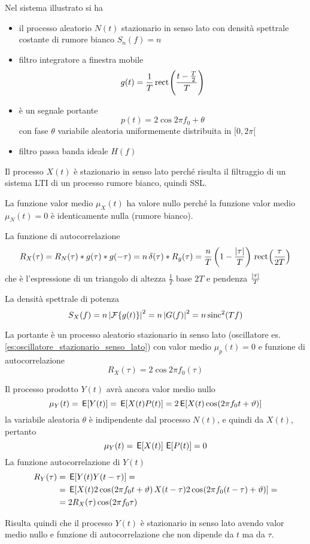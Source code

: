 Nel sistema illustrato si ha
\begin{itemize}
\item il processo aleatorio $N(t)$ stazionario in senso lato con densità spettrale costante di rumore bianco $S_n(f)=n$
\item filtro integratore a finestra mobile
\[
	g(t)=\frac{1}{T}\,{\operatorname{rect}}^{}\!\left({\frac{t-\frac{T}{2}}{T}}\right)
\]
\item è un segnale portante
\[
	p(t)=2\cos{2\pi f_0+\theta}
\]
con fase $\theta$ variabile aleatoria uniformemente distribuita in $[0,2\pi[$
\item filtro passa banda ideale $H(f)$
\end{itemize}

Il processo $X(t)$ è stazionario in senso lato perché risulta il filtraggio di un sistema LTI di un processo rumore bianco, quindi SSL.

La funzione valor medio $\mu_X(t)$ ha valore nullo perché la funzione valor medio $\mu_N(t)=0$ è identicamente nulla (rumore bianco).

La funzione di autocorrelazione
\[
	R_X(\tau)=R_N(\tau)\ast g(\tau)\ast g(-\tau)=n\operatorname{\delta}(\tau)\ast R_g(\tau)= \frac{n}{T}\left(1-\frac{\left|{\tau}\right|}{T}\right)\,{\operatorname{rect}}^{}\!\left({\frac{\tau}{2T}}\right)
\]
che è l'espressione di un triangolo di altezza $\frac{1}{T}$ base $2T$ e pendenza $\frac{\left|{\tau}\right|}{T}$

La densità spettrale di potenza
\[
	S_X(f)=n \left|{\operatorname{\mathcal{F}}\!\left\lbrace{g(t)}\right\rbrace}\right|^2=n\left|{G(f)}\right|^2=n\operatorname{sinc}^2(T f)
\]

La portante è un processo aleatorio stazionario in senso lato (oscillatore es.\ref{es:oscillatore_stazionario_senso_lato}) con valor medio $\mu_p(t)=0$ e funzione di autocorrelazione
\[
	R_X(\tau)=2\cos{2\pi f_0(\tau)}
\]

Il processo prodotto $Y(t)$ avrà ancora valor medio nullo
\[
	\mu_Y(t)=\,{\operatorname{\mathsf{E}}}\!\left[{Y(t)}\right]=\,{\operatorname{\mathsf{E}}}\!\left[{X(t)P(t)}\right]=2 \,{\operatorname{\mathsf{E}}}\!\left[{X(t)\,{\operatorname{cos}}^{}\!\left({2\pi f_0 t+\vartheta}\right)}\right]
\]
la variabile aleatoria $\theta$ è indipendente dal processo $N(t)$, e quindi da $X(t)$, pertanto
\[
	\mu_Y(t)=\,{\operatorname{\mathsf{E}}}\!\left[{X(t)}\right]\,{\operatorname{\mathsf{E}}}\!\left[{P(t)}\right]=0
\]
La funzione autocorrelazione di $Y(t)$
\[
	\begin{split}
		R_Y(\tau)&=\,{\operatorname{\mathsf{E}}}\!\left[{Y(t)Y(t-\tau)}\right]=\\
		&=\,{\operatorname{\mathsf{E}}}\!\left[{X(t)2\,{\operatorname{cos}}^{}\!\left({2\pi f_0 t+\vartheta}\right) X(t-\tau)2\,{\operatorname{cos}}^{}\!\left({2\pi f_0 (t-\tau)+\vartheta}\right)}\right]=\\
		&=2 R_X(\tau)\,{\operatorname{cos}}^{}\!\left({2\pi f_0\tau}\right)
	\end{split}
\]

Risulta quindi che il processo $Y(t)$ è stazionario in senso lato avendo valor medio nullo e funzione di autocorrelazione che non dipende da $t$ ma da $\tau$.

